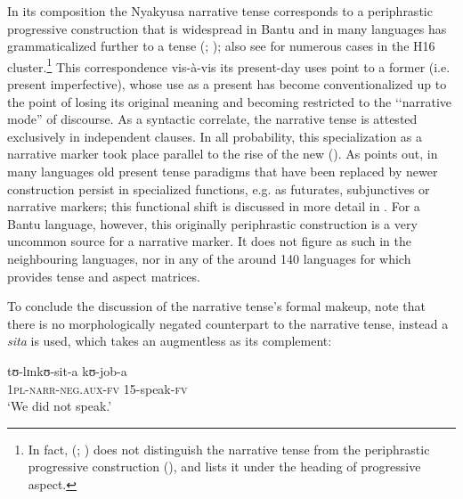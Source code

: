 In its composition the Nyakyusa narrative tense corresponds to a periphrastic progressive construction that is widespread in Bantu and in many languages has grammaticalized further to a  tense (\citealt{BastinY1989a}; \citeyear{BastinY1989b}); also see \citet{deKindJetal2015} for numerous cases in the  H16 cluster.\footnote{In fact, \citeauthor{LusekeloA2008} (\citeyear{LusekeloA2008}; \citeyear{LusekeloA2013}) does not distinguish the narrative tense from the periphrastic progressive construction (), and lists it under the heading of progressive aspect.} This correspondence vis-à-vis its present-day uses point to a former  (i.e. present imperfective), whose use as a  present has become conventionalized up to the point of losing its original meaning and becoming restricted to the \lq\lq narrative mode'' \citep{SmithC2003} of discourse. As a syntactic correlate, the narrative tense is attested exclusively in independent clauses. In all probability, this specialization as a narrative marker took place parallel to the rise of the new  (). As \citet{HaspelmathM1998} points out, in many languages old present tense paradigms that have been replaced by newer construction persist in specialized functions, e.g. as futurates, subjunctives or narrative markers; this functional shift is discussed in more detail in \citet{PersohnB2016}. For a Bantu language, however, this originally periphrastic construction  is a very uncommon source for a narrative marker. It does not figure as such in the neighbouring languages, nor in any of the around 140 languages for which \citet{NurseD2008} provides tense and aspect matrices. 

To conclude the discussion of the narrative tense's formal makeup, note that there is no morphologically negated counterpart to the narrative tense, instead a   \textit{sita} is used, which takes an augmentless  as its complement:

\begin{exe}
\ex \gll tʊ-lɪnkʊ-sit-a kʊ-job-a\\
\textsc{1pl}-\textsc{narr}-\textsc{neg.aux}-\textsc{fv} 15-speak-\textsc{fv}\\
\glt `We did not speak.'
\end{exe}

